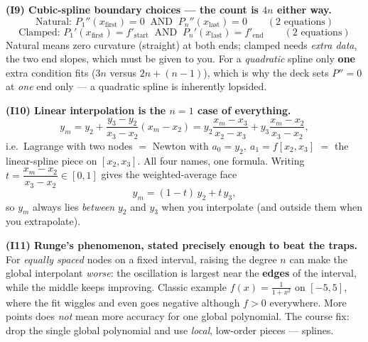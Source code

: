 \begin{derivedbox}
\medskip
\textbf{(I9) Cubic-spline boundary choices --- the count is $4n$ either way.}
\[
  \text{Natural: } P_1''(x_{\text{first}})=0 \ \text{ AND }\
  P_n''(x_{\text{last}})=0 \qquad (2\text{ equations})
\]
\[
  \text{Clamped: } P_1'(x_{\text{first}})=f'_{\text{start}} \ \text{ AND }\
  P_n'(x_{\text{last}})=f'_{\text{end}} \qquad (2\text{ equations})
\]
Natural means zero curvature (straight) at both ends; clamped needs \emph{extra data},
the two end slopes, which must be given to you.
For a \emph{quadratic} spline only \textbf{one} extra condition fits
($3n$ versus $2n+(n-1)$), which is why the deck sets $P''=0$ at \emph{one} end only ---
a quadratic spline is inherently lopsided.

\medskip
\textbf{(I10) Linear interpolation is the $n=1$ case of everything.}
\[
  y_m=y_2+\frac{y_3-y_2}{x_3-x_2}(x_m-x_2)
     =y_2\frac{x_m-x_3}{x_2-x_3}+y_3\frac{x_m-x_2}{x_3-x_2},
\]
i.e.\ Lagrange with two nodes $=$ Newton with $a_0=y_2,\ a_1=f[x_2,x_3]$
$=$ the linear-spline piece on $[x_2,x_3]$. All four names, one formula.
Writing $t=\dfrac{x_m-x_2}{x_3-x_2}\in[0,1]$ gives the weighted-average face
\[
  y_m=(1-t)\,y_2+t\,y_3 ,
\]
so $y_m$ always lies \emph{between} $y_2$ and $y_3$ when you interpolate (and outside
them when you extrapolate).

\medskip
\textbf{(I11) Runge's phenomenon, stated precisely enough to beat the traps.}
For \emph{equally spaced} nodes on a fixed interval, raising the degree $n$ can make the
global interpolant \emph{worse}: the oscillation is largest near the \textbf{edges} of the
interval, while the middle keeps improving. Classic example
$f(x)=\frac{1}{1+x^2}$ on $[-5,5]$, where the fit wiggles and even goes negative although
$f>0$ everywhere. More points does \emph{not} mean more accuracy for one global
polynomial. The course fix: drop the single global polynomial and use \emph{local},
low-order pieces --- splines.
\end{derivedbox}

